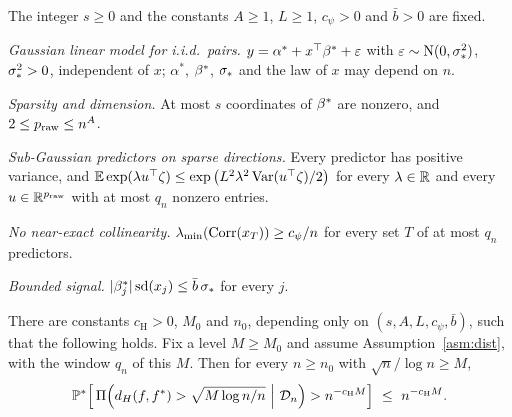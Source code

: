 \begin{localassumption}\label{asm:dist}
The integer $s\ge0$ and the constants $A\ge1$, $L\ge1$, $c_\psi>0$ and $\bar b>0$ are fixed.
\begin{asmitems}
  \item\label{asm:dist-model} \emph{Gaussian linear model for i.i.d.\ pairs.} $y=\alpha^*+x^\top\beta^*+\varepsilon$ with
    $\varepsilon\sim\mathrm{N}(0,\sigma_*^2)$, $\sigma_*^2>0$, independent of $x$; $\alpha^*$, $\beta^*$, $\sigma_*$ and the law of $x$ may
    depend on $n$.
  \item\label{asm:dist-sparse} \emph{Sparsity and dimension.} At most $s$ coordinates of $\beta^*$ are nonzero, and
    $2\le p_{\mathrm{raw}}\le n^A$.
  \item\label{asm:dist-subg} \emph{Sub-Gaussian predictors on sparse directions.} Every predictor has positive variance,
    and $\operatorname{\mathbb{E}}\exp(\lambda u^\top\zeta)\le\exp\big(L^2\lambda^2\operatorname{Var}(u^\top\zeta)/2\big)$ for every $\lambda\in\mathbb{R}$ and every
    $u\in\mathbb{R}^{p_{\mathrm{raw}}}$ with at most $q_n$ nonzero entries.
  \item\label{asm:dist-nec} \emph{No near-exact collinearity.} $\lambda_{\min}(\operatorname{Corr}(x_T))\ge c_\psi/n$ for every set $T$ of at
    most $q_n$ predictors.
  \item\label{asm:dist-bs} \emph{Bounded signal.} $\lvert \beta^*_j\rvert\operatorname{sd}(x_j)\le\bar b\,\sigma_*$ for every $j$.
\end{asmitems}
\end{localassumption}

\begin{theorem}\label{thm:dist}
There are constants $c_{\mathrm H}>0$, $M_0$ and $n_0$, depending only on $(s,A,L,c_\psi,\bar b)$, such that the following
holds. Fix a level $M\ge M_0$ and assume Assumption~\ref{asm:dist}, with the window $q_n$ of this $M$. Then for every
$n\ge n_0$ with $\sqrt n/\log n\ge M$,
\begin{equation}\label{eq:dist-i}
  \P^*\Big[\,\Pi\Big(d_H(f,f^*)>\sqrt{M\log n/n}\ \Big|\ \Dn\Big)>n^{-c_{\mathrm H} M}\Big]\ \le\ n^{-c_{\mathrm H} M}.
\end{equation}
\end{theorem}



